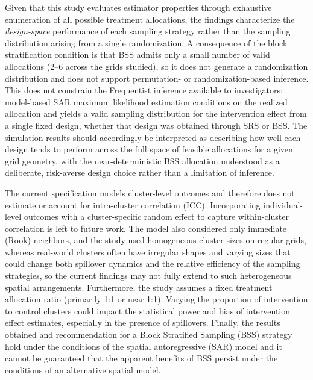 \documentclass[
  12pt,
  prelim]{bios-prelim}
\begin{document}
Given that this study evaluates estimator properties through exhaustive
enumeration of all possible treatment allocations, the findings
characterize the \emph{design-space} performance of each sampling
strategy rather than the sampling distribution arising from a single
randomization. A consequence of the block stratification condition is
that BSS admits only a small number of valid allocations (2--6 across
the grids studied), so it does not generate a randomization distribution
and does not support permutation- or randomization-based inference. This
does not constrain the Frequentist inference available to investigators:
model-based SAR maximum likelihood estimation conditions on the realized
allocation and yields a valid sampling distribution for the intervention
effect from a single fixed design, whether that design was obtained
through SRS or BSS. The simulation results should accordingly be
interpreted as describing how well each design tends to perform across
the full space of feasible allocations for a given grid geometry, with
the near-deterministic BSS allocation understood as a deliberate,
risk-averse design choice rather than a limitation of inference.

The current specification models cluster-level outcomes and therefore
does not estimate or account for intra-cluster correlation (ICC).
Incorporating individual-level outcomes with a cluster-specific random
effect to capture within-cluster correlation is left to future work. The
model also considered only immediate (Rook) neighbors, and the study
used homogeneous cluster sizes on regular grids, whereas real-world
clusters often have irregular shapes and varying sizes that could change
both spillover dynamics and the relative efficiency of the sampling
strategies, so the current findings may not fully extend to such
heterogeneous spatial arrangements. Furthermore, the study assumes a
fixed treatment allocation ratio (primarily 1:1 or near 1:1). Varying
the proportion of intervention to control clusters could impact the
statistical power and bias of intervention effect estimates, especially
in the presence of spillovers. Finally, the results obtained and
recommendation for a Block Stratified Sampling (BSS) strategy hold under
the conditions of the spatial autoregressive (SAR) model and it cannot
be guaranteed that the apparent benefits of BSS persist under the
conditions of an alternative spatial model.
\end{document}
